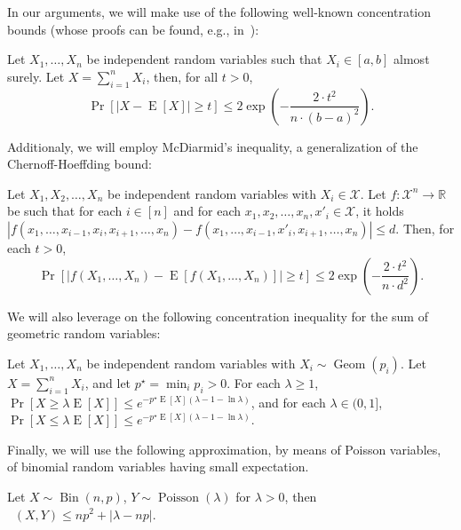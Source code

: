 \documentclass[11pt]{article}
\DeclareMathOperator{\geom}{Geom}
\DeclareMathOperator*{\E}{E}
\DeclareMathOperator*{\Bin}{Bin}
\DeclareMathOperator*{\Poisson}{Poisson}
\DeclareMathOperator*{\dTV}{\textit{d}_{TV}}
\begin{document}
In our arguments, we will make use of the following well-known concentration bounds (whose proofs can be found, e.g., in~\cite{dp09}): 
\begin{fact}\label{fact:chernoff-hoeffding}
Let $X_1, \dots, X_n$ be independent random variables such that $X_i\in [a,b]$ almost surely. Let $X=\sum_{i=1}^n X_i$, then, for all $t>0$, $$\Pr[|X - \E[X]| \geq t] \leq 2 \exp\left(- \frac{2\cdot t^2}{n\cdot(b-a)^2}\right).$$
\end{fact}
Additionaly, we will employ McDiarmid's inequality, a generalization of the Chernoff-Hoeffding bound:
\begin{fact}
\label{fact:mcdiarmid}
Let $X_1, X_2, \dots, X_n$ be independent random variables with $X_i\in \mathcal{X}$. Let $f:\mathcal{X}^n \rightarrow \mathbb{R}$ be such that for each $i\in[n]$ and for each $x_1, x_2, \dots, x_n, x'_i \in \mathcal{X}$, it holds $|f(x_1, \dots, x_{i-1}, x_i, x_{i+1}, \dots, x_n) - f(x_1, \dots, x_{i-1}, x'_i, x_{i+1}, \dots, x_n)| \leq d$. Then, for each $t>0$, 
\[
\Pr[|f(X_1, \dots, X_n) - \E[f(X_1, \dots, X_n)]| \ge t] \leq 2 \exp\left(- \frac{2 \cdot t^2}{n\cdot d^2}\right).
\]
\end{fact}
We will also leverage on the following concentration inequality for the sum of geometric random variables:
\begin{fact}\label{fact:geom-concentration} Let $X_1, \dots, X_n$ be independent random variables with $X_i\sim\geom(p_i)$. Let $X=\sum_{i=1}^n X_i$, and let $p^\star=\min_i p_i > 0$. For each $\lambda\ge 1$, $\Pr[X\ge \lambda \E[X]] \leq e^{-p^\star \E[X] (\lambda-1-\ln\lambda)}$, and for each $\lambda\in(0,1]$, $\Pr[X\le \lambda \E[X]] \leq e^{-p^\star \E[X] (\lambda-1-\ln\lambda)}$.
\end{fact}
Finally, we will use the following  approximation, by means of Poisson variables, of binomial random variables having small expectation.\begin{fact}\label{fact:lecam}
Let $X\sim\Bin(n,p)$, $Y\sim \Poisson(\lambda)$ for $\lambda > 0$, then $\dTV(X,Y) \leq np^2 + |\lambda - np|$.
\end{fact}


  
\end{document}
